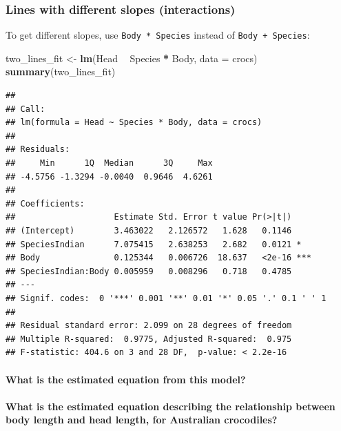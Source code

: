 \documentclass[14pt]{extarticle}
\newenvironment{Shaded}{\begin{snugshade}}{\end{snugshade}}
\newcommand{\KeywordTok}[1]{\textcolor[rgb]{0.13,0.29,0.53}{\textbf{#1}}}
\newcommand{\DataTypeTok}[1]{\textcolor[rgb]{0.13,0.29,0.53}{#1}}
\newcommand{\StringTok}[1]{\textcolor[rgb]{0.31,0.60,0.02}{#1}}
\newcommand{\OperatorTok}[1]{\textcolor[rgb]{0.81,0.36,0.00}{\textbf{#1}}}
\newcommand{\NormalTok}[1]{#1}
\let\oldparagraph\paragraph
\renewcommand{\paragraph}[1]{\oldparagraph{#1}\mbox{}}
\begin{document}
\newpage

\subsubsection{Lines with different slopes
(interactions)}\label{lines-with-different-slopes-interactions}

To get different slopes, use \texttt{Body\ *\ Species} instead of
\texttt{Body\ +\ Species}:

\begin{Shaded}
\begin{Highlighting}[]
\NormalTok{two_lines_fit <-}\StringTok{ }\KeywordTok{lm}\NormalTok{(Head }\OperatorTok{~}\StringTok{ }\NormalTok{Species }\OperatorTok{*}\StringTok{ }\NormalTok{Body, }\DataTypeTok{data =}\NormalTok{ crocs)}
\KeywordTok{summary}\NormalTok{(two_lines_fit)}
\end{Highlighting}
\end{Shaded}

\begin{verbatim}
## 
## Call:
## lm(formula = Head ~ Species * Body, data = crocs)
## 
## Residuals:
##     Min      1Q  Median      3Q     Max 
## -4.5756 -1.3294 -0.0040  0.9646  4.6261 
## 
## Coefficients:
##                    Estimate Std. Error t value Pr(>|t|)    
## (Intercept)        3.463022   2.126572   1.628   0.1146    
## SpeciesIndian      7.075415   2.638253   2.682   0.0121 *  
## Body               0.125344   0.006726  18.637   <2e-16 ***
## SpeciesIndian:Body 0.005959   0.008296   0.718   0.4785    
## ---
## Signif. codes:  0 '***' 0.001 '**' 0.01 '*' 0.05 '.' 0.1 ' ' 1
## 
## Residual standard error: 2.099 on 28 degrees of freedom
## Multiple R-squared:  0.9775, Adjusted R-squared:  0.975 
## F-statistic: 404.6 on 3 and 28 DF,  p-value: < 2.2e-16
\end{verbatim}

\paragraph{What is the estimated equation from this
model?}\label{what-is-the-estimated-equation-from-this-model}

\vspace{3cm}

\paragraph{What is the estimated equation describing the relationship
between body length and head length, for Australian
crocodiles?}\label{what-is-the-estimated-equation-describing-the-relationship-between-body-length-and-head-length-for-australian-crocodiles-1}
\end{document}

